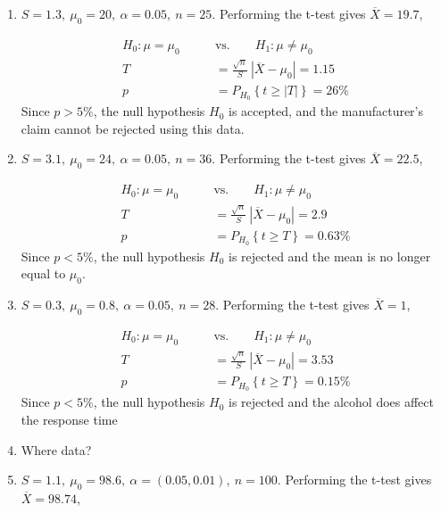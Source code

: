 \begin{enumerate}
	
	\item $ S = 1.3,\ \mu_0 = 20,\ \alpha = 0.05,\ n = 25$. Performing the t-test gives $ \overline{X} = 19.7 $,
	
		\begin{align}
			H_0 : \mu = \mu_0 \qquad &\text{vs.} \qquad H_1 : \mu \neq \mu_0 \nonumber \\
			T &= \frac{\sqrt{n}}{S}\ |\overline{X} - \mu_0| = 1.15 \nonumber \\
			p &= P_{H_0}\left\{t \geq |T|\right\} = 26\% 
		\end{align}
		Since $ p > 5\% $, the null hypothesis $ H_0 $ is accepted, and the manufacturer's claim cannot be rejected using this data.
	
	
	\item $ S = 3.1,\ \mu_0 = 24,\ \alpha = 0.05,\ n = 36$. Performing the t-test gives $ \overline{X} = 22.5 $,
	
		\begin{align}
			H_0 : \mu = \mu_0 \qquad &\text{vs.} \qquad H_1 : \mu \neq \mu_0 \nonumber \\
			T &= \frac{\sqrt{n}}{S}\ |\overline{X} - \mu_0| = 2.9 \nonumber \\
			p &= P_{H_0}\left\{t \geq T\right\} = 0.63\% 
		\end{align}
		Since $ p < 5\% $, the null hypothesis $ H_0 $ is rejected and the mean is no longer equal to $ \mu_0 $.
	
	
	\item $ S = 0.3,\ \mu_0 = 0.8,\ \alpha = 0.05,\ n = 28$. Performing the t-test gives $ \overline{X} = 1 $,
	
		\begin{align}
			H_0 : \mu = \mu_0 \qquad &\text{vs.} \qquad H_1 : \mu \neq \mu_0 \nonumber \\
			T &= \frac{\sqrt{n}}{S}\ |\overline{X} - \mu_0| = 3.53 \nonumber \\
			p &= P_{H_0}\left\{t \geq T\right\} = 0.15\% 
		\end{align}
		Since $ p < 5\% $, the null hypothesis $ H_0 $ is rejected and the alcohol does affect the response time\\
	
	
	\item Where data?\\
	
	\item $ S = 1.1,\ \mu_0 = 98.6,\ \alpha = (0.05, 0.01),\ n = 100$. Performing the t-test gives $ \overline{X} = 98.74 $,
	

\end{enumerate}
